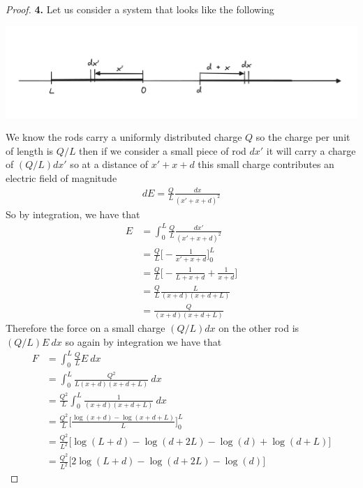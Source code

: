\documentclass[11pt]{article}
\theoremstyle{definition}
\begin{document}
\begin{proof}{\textbf{4.}}
    Let us consider a system that looks like the following
    \begin{center}
        \includegraphics*[scale=0.3]{ch2-4.png}
    \end{center}
    We know the rods carry a uniformly distributed charge $Q$ so the charge
    per unit of length is $Q/L$ then if we consider a small piece of rod $dx'$
    it will carry a charge of $(Q/L)dx'$ so at a distance of $x' + x + d$ this
    small charge contributes an electric field of magnitude
    \begin{align*}
        dE = \frac{Q}{L} \frac{dx}{(x'+ x + d)^2}
    \end{align*}
    So by integration, we have that
    \begin{align*}
        E &= \int_0^L \frac{Q}{L} \frac{dx'}{(x'+ x +d)^2}\\
        &= \frac{Q}{L} \bigg[-\frac{1}{x' + x + d}\bigg]_0^L\\
        &= \frac{Q}{L} \bigg[-\frac{1}{L + x + d} + \frac{1}{x + d}\bigg]\\
        &= \frac{Q}{L} \frac{L}{(x + d)(x + d + L)}\\
        &= \frac{Q}{(x + d)(x + d + L)}
    \end{align*}
    Therefore the force on a small charge $(Q/L)dx$ on the other rod is
    $(Q/L)E~dx$ so again by integration we have that
    \begin{align*}
        F &= \int_0^L \frac{Q}{L}E~dx\\
        &= \int_0^L \frac{Q^2}{L(x + d)(x + d + L)}~dx\\
        &= \frac{Q^2}{L}\int_0^L \frac{1}{(x + d)(x + d + L)}~dx\\
        &= \frac{Q^2}{L}\bigg[\frac{\log(x + d) - \log(x + d + L)}{L}\bigg]_0^L\\
        &= \frac{Q^2}{L^2}\bigg[
            \log(L + d) - \log(d + 2L) - \log(d) + \log(d + L)
        \bigg]\\
        &= \frac{Q^2}{L^2}\bigg[
            2\log(L + d) - \log(d + 2L) - \log(d)
        \bigg]
    \end{align*}
\end{proof}
\end{document}

